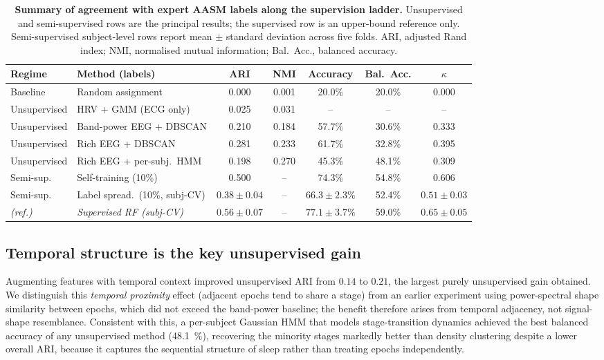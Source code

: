 \documentclass[11pt,a4paper]{article}
\begin{document}
\begin{table}[t]
\centering
\small
\caption{\textbf{Summary of agreement with expert AASM labels along the supervision
ladder.} Unsupervised and semi-supervised rows are the principal results; the
supervised row is an upper-bound reference only. Semi-supervised subject-level rows
report mean $\pm$ standard deviation across five folds. ARI, adjusted Rand index;
NMI, normalised mutual information; Bal.\ Acc., balanced accuracy.}
\label{tab:main}
\begin{tabular}{llccccc}
\toprule
Regime & Method (labels) & ARI & NMI & Accuracy & Bal.\ Acc. & $\kappa$ \\
\midrule
Baseline      & Random assignment        & 0.000 & 0.001 & 20.0\% & 20.0\% & 0.000 \\
Unsupervised  & HRV + GMM (ECG only)     & 0.025 & 0.031 & --     & --     & --    \\
Unsupervised  & Band-power EEG + DBSCAN  & 0.210 & 0.184 & 57.7\% & 30.6\% & 0.333 \\
Unsupervised  & Rich EEG + DBSCAN        & 0.281 & 0.233 & 61.7\% & 32.8\% & 0.395 \\
Unsupervised  & Rich EEG + per-subj.\ HMM& 0.198 & 0.270 & 45.3\% & 48.1\% & 0.309 \\
Semi-sup.\    & Self-training (10\%)     & 0.500 & --    & 74.3\% & 54.8\% & 0.606 \\
Semi-sup.\    & Label spread.\ (10\%, subj-CV) & $0.38{\pm}0.04$ & -- & $66.3{\pm}2.3\%$ & 52.4\% & $0.51{\pm}0.03$ \\
\textit{(ref.)} & \textit{Supervised RF (subj-CV)} & $0.56{\pm}0.07$ & -- & $77.1{\pm}3.7\%$ & 59.0\% & $0.65{\pm}0.05$ \\
\bottomrule
\end{tabular}
\end{table}

\subsection{Temporal structure is the key unsupervised gain}
\label{sec:temporal}
Augmenting features with temporal context improved unsupervised ARI from $0.14$ to
$0.21$, the largest purely unsupervised gain obtained. We distinguish this
\emph{temporal proximity} effect (adjacent epochs tend to share a stage) from an
earlier experiment using power-spectral shape similarity between epochs, which did
not exceed the band-power baseline; the benefit therefore arises from temporal
adjacency, not signal-shape resemblance. Consistent with this, a per-subject
Gaussian HMM that models stage-transition dynamics achieved the best balanced
accuracy of any unsupervised method (\SI{48.1}{\percent}), recovering the minority
stages markedly better than density clustering despite a lower overall ARI, because
it captures the sequential structure of sleep rather than treating epochs
independently.
\end{document}
